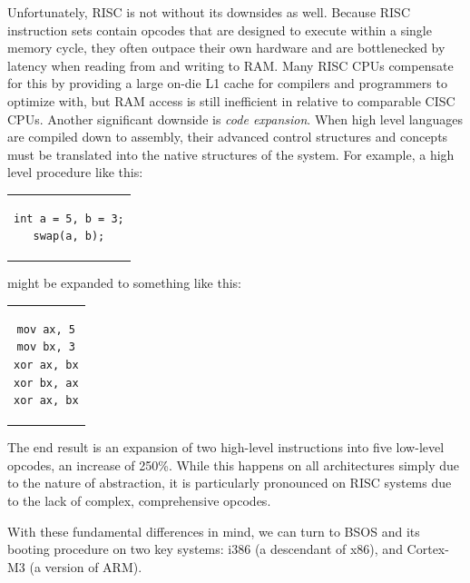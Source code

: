 \documentclass[english]{paper}
\begin{document}
Unfortunately, RISC is not without its downsides as well. Because RISC instruction sets contain opcodes that are designed to execute within a single memory cycle, they often outpace their own hardware and are bottlenecked by latency when reading from and writing to RAM. Many RISC CPUs compensate for this by providing a large on-die L1 cache for compilers and programmers to optimize with, but RAM access is still inefficient in relative to comparable CISC CPUs. Another significant downside is \textit{code expansion}. When high level languages are compiled down to assembly, their advanced control structures and concepts must be translated into the native structures of the system. For example, a high level procedure like this:
\begin{center}
\begin{tabular}{c}
\begin{lstlisting}
int a = 5, b = 3;
swap(a, b);
\end{lstlisting}
\end{tabular}
\end{center}
might be expanded to something like this:
\begin{center}
\begin{tabular}{c}
\begin{lstlisting}
mov ax, 5
mov bx, 3
xor ax, bx
xor bx, ax
xor ax, bx
\end{lstlisting}
\end{tabular}
\end{center}
The end result is an expansion of two high-level instructions into five low-level opcodes, an increase of 250\%. While this happens on all architectures simply due to the nature of abstraction, it is particularly pronounced on RISC systems due to the lack of complex, comprehensive opcodes.

With these fundamental differences in mind, we can turn to BSOS and its booting procedure on two key systems: i386 (a descendant of x86), and Cortex-M3 (a version of ARM).
\end{document}

